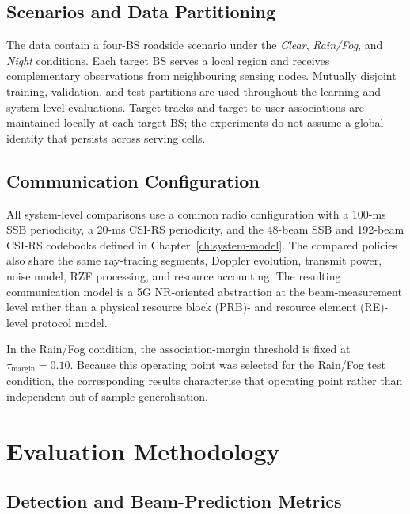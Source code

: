 \subsection{Scenarios and Data Partitioning}
\label{subsec:experiments-scenario}

The data contain a four-BS roadside scenario under the \emph{Clear},
\emph{Rain/Fog}, and \emph{Night} conditions.  Each target BS serves a local
region and receives complementary observations from neighbouring sensing nodes.
Mutually disjoint training, validation, and test partitions are used throughout
the learning and system-level evaluations.  Target tracks and
target-to-user associations are maintained locally at each target BS; the
experiments do not assume a global identity that persists across serving cells.

\subsection{Communication Configuration}
\label{subsec:experiments-communication-configuration}

All system-level comparisons use a common radio configuration with a 100-ms
SSB periodicity, a 20-ms CSI-RS periodicity, and the 48-beam SSB and 192-beam
CSI-RS codebooks defined in Chapter~\ref{ch:system-model}.  The compared
policies also share the same ray-tracing segments, Doppler evolution, transmit
power, noise model, RZF processing, and resource
accounting.  The resulting communication model is a 5G NR-oriented abstraction
at the beam-measurement level rather than a physical resource block (PRB)- and
resource element (RE)-level protocol model.

In the Rain/Fog condition, the association-margin threshold is fixed at
\(\tau_{\mathrm{margin}}=0.10\).  Because this operating point was selected
for the Rain/Fog test condition, the corresponding results characterise that
operating point rather than independent out-of-sample generalisation.

\section{Evaluation Methodology}
\label{sec:experiments-metrics}

\subsection{Detection and Beam-Prediction Metrics}
\label{subsec:experiments-learning-metrics}

